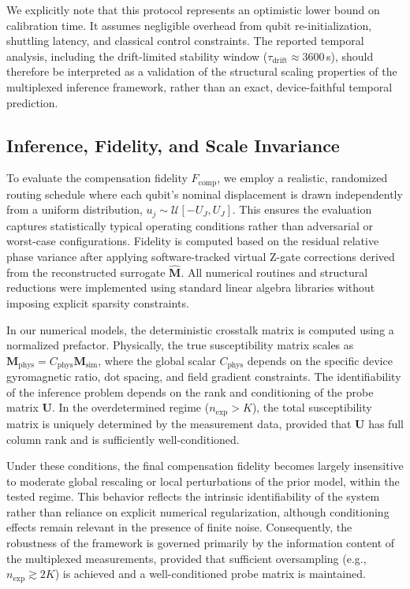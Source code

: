 \documentclass[a4paper,twocolumn,11pt]{quantumarticle}
\begin{document}
We explicitly note that this protocol represents an optimistic lower bound on calibration time. It assumes negligible overhead from qubit re-initialization, shuttling latency, and classical control constraints. The reported temporal analysis, including the drift-limited stability window ($\tau_{\text{drift}} \approx 3600$\,s), should therefore be interpreted as a validation of the structural scaling properties of the multiplexed inference framework, rather than an exact, device-faithful temporal prediction.

\subsection*{Inference, Fidelity, and Scale Invariance}
To evaluate the compensation fidelity $F_{\text{comp}}$, we employ a realistic, randomized routing schedule where each qubit's nominal displacement is drawn independently from a uniform distribution, $u_j \sim \mathcal{U}[-U_J, U_J]$. This ensures the evaluation captures statistically typical operating conditions rather than adversarial or worst-case configurations. Fidelity is computed based on the residual relative phase variance after applying software-tracked virtual Z-gate corrections derived from the reconstructed surrogate $\hat{\mathbf{M}}$. All numerical routines and structural reductions were implemented using standard linear algebra libraries without imposing explicit sparsity constraints.

In our numerical models, the deterministic crosstalk matrix is computed using a normalized prefactor. Physically, the true susceptibility matrix scales as $\mathbf{M}_{\text{phys}} = C_{\text{phys}} \mathbf{M}_{\text{sim}}$, where the global scalar $C_{\text{phys}}$ depends on the specific device gyromagnetic ratio, dot spacing, and field gradient constraints. 
The identifiability of the inference problem depends on the rank and conditioning of the probe matrix $\mathbf{U}$. In the overdetermined regime ($n_{\text{exp}} > K$), the total susceptibility matrix is uniquely determined by the measurement data, provided that $\mathbf{U}$ has full column rank and is sufficiently well-conditioned. 

Under these conditions, the final compensation fidelity becomes largely insensitive to moderate global rescaling or local perturbations of the prior model, within the tested regime. This behavior reflects the intrinsic identifiability of the system rather than reliance on explicit numerical regularization, although conditioning effects remain relevant in the presence of finite noise. Consequently, the robustness of the framework is governed primarily by the information content of the multiplexed measurements, provided that sufficient oversampling (e.g., $n_{\text{exp}} \gtrsim 2K$) is achieved and a well-conditioned probe matrix is maintained.
\end{document}
